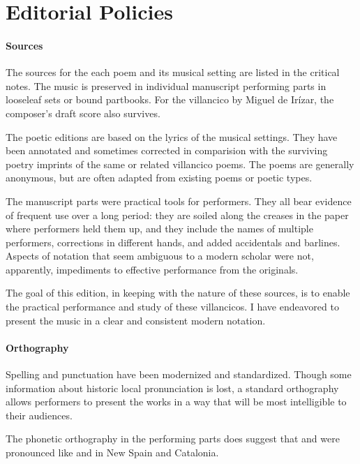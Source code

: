 \section{Editorial Policies}

\paragraph{Sources}

The sources for the each poem and its musical setting are listed in the 
critical notes.
The music is preserved in individual manuscript performing parts in looseleaf 
sets or bound partbooks.
For the villancico by Miguel de Irízar, the composer's draft score also 
survives.

The poetic editions are based on the lyrics of the musical settings.
They have been annotated and sometimes corrected in comparision with the 
surviving poetry imprints of the same or related villancico poems.
The poems are generally anonymous, but are often adapted from existing poems or 
poetic types.

The manuscript parts were practical tools for performers.
They all bear evidence of frequent use over a long period: they are soiled 
along the creases in the paper where performers held them up, and they include 
the names of multiple performers, corrections in different hands, and added 
accidentals and barlines.
Aspects of notation that seem ambiguous to a modern scholar were not, 
apparently, impediments to effective performance from the originals.

The goal of this edition, in keeping with the nature of these sources, is to 
enable the practical performance and study of these villancicos.
I have endeavored to present the music in a clear and consistent modern 
notation.


\paragraph{Orthography}
Spelling and punctuation have been modernized and standardized.
Though some information about historic local pronunciation is lost, a standard 
orthography allows performers to present the works in a way that will be most 
intelligible to their audiences.%
  \begin{Footnote}
      The phonetic orthography in the performing parts does suggest that 
       and  were pronounced like  and 
       in New Spain and Catalonia.
  \end{Footnote}

